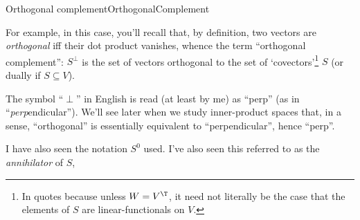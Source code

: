 \begin{dfn}{Orthogonal complement}{OrthogonalComplement}
\begin{rmk}
		For example, in this case, you'll recall that, by definition, two vectors are \emph{orthogonal} iff their dot product vanishes, whence the term ``orthogonal complement'':  $S^{\perp}$ is the set of vectors orthogonal to the set of `covectors'\footnote{In quotes because unless $W=V^{\T}$, it need not literally be the case that the elements of $S$ are linear-functionals on $V$.} $S$ (or dually if $S\subseteq V$).
	\end{rmk}
	\begin{rmk}
		The symbol ``$\perp$'' in English is read (at least by me) as ``perp'' (as in ``\emph{perp}endicular'').  We'll see later when we study inner-product spaces that, in a sense, ``orthogonal'' is essentially equivalent to ``perpendicular'', hence ``perp''.
	\end{rmk}
	\begin{rmk}
		I have also seen the notation $S^0$ used.  I've also seen this referred to as the \emph{annihilator} of $S$, 
	\end{rmk}
\end{dfn}
